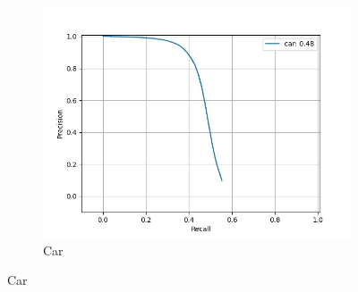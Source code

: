 \begin{figure}[H]
\begin{subfigure}[t]{0.325\textwidth}
    		\includegraphics[width=\textwidth]{images/bnn_pr/class_car_pr.jpg}
    		\caption{Car}
    	\end{subfigure}
    	
        	
        

\end{figure}
